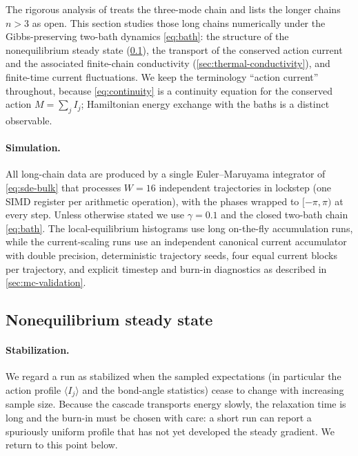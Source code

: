 \documentclass[11pt,a4paper]{article}
\theoremstyle{definition}
\numberwithin{equation}{section}   %
\begin{document}
The rigorous analysis of \cite{HLNS} treats the three-mode chain and lists the
longer chains $n>3$ as open. This section studies those long chains
numerically under the Gibbs-preserving two-bath dynamics \eqref{eq:bath}: the
structure of the nonequilibrium steady state (\cref{sec:ness-long}), the
transport of the conserved action current and the associated finite-chain
conductivity (\cref{sec:thermal-conductivity}), and finite-time current
fluctuations. We keep the terminology ``action current'' throughout, because
\eqref{eq:continuity} is a continuity equation for the conserved action
$M=\sum_j I_j$; Hamiltonian energy exchange with the baths is a distinct
observable.

\paragraph{Simulation.}
All long-chain data are produced by a single Euler--Maruyama integrator of
\eqref{eq:sde-bulk} that processes $W=16$ independent trajectories in lockstep
(one SIMD register per arithmetic operation), with the phases wrapped to
$[-\pi,\pi)$ at every step. Unless otherwise stated we use $\gamma=0.1$ and the
closed two-bath chain \eqref{eq:bath}. The local-equilibrium histograms use
long on-the-fly accumulation runs, while the current-scaling runs use an
independent canonical current accumulator with double precision, deterministic
trajectory seeds, four equal current blocks per trajectory, and explicit
timestep and burn-in diagnostics as described in \cref{sec:mc-validation}.

\subsection{Nonequilibrium steady state}\label{sec:ness-long}

\paragraph{Stabilization.}
We regard a run as stabilized when the sampled expectations (in particular the
action profile $\langle I_j\rangle$ and the bond-angle statistics) cease to
change with increasing sample size. Because the cascade transports energy
slowly, the relaxation time is long and the burn-in must be chosen with care:
a short run can report a spuriously uniform profile that has not yet developed
the steady gradient. We return to this point below.
\end{document}
